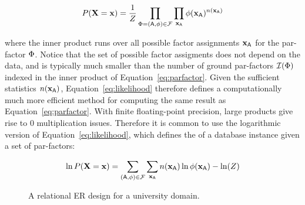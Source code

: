 \begin{equation} \label{eq:likelihood}
P(\mathbf{X}=\mathbf{x}) = \frac{1}{Z} \prod_{\Phi =(\mathsf{A},\phi) \in \mathcal{F}} \prod_{\mathbf{x}_{\mathsf{A}}} 
\phi(\mathbf{x}_{\mathsf{A}})^{n(\mathbf{x}_{\mathsf{A}})}
\end{equation}

where the inner product runs over all possible factor assignments $\mathbf{x}_{\mathsf{A}}$ for the par-factor $\Phi$. Notice that the set of possible factor assigments  does not depend on the data, and is typically much smaller than the number of ground par-factors $\mathcal{I}(\Phi)$ indexed in the inner product of Equation~\ref{eq:parfactor}. Given the sufficient statistics $n(\mathbf{x}_{\mathsf{A}})$, Equation~\ref{eq:likelihood} therefore defines a computationally much more efficient  method for computing the same result as Equation~\ref{eq:parfactor}. With finite floating-point precision, large products give rise to 0 multiplication issues. Therefore it is common to use the logarithmic version of Equation~\ref{eq:likelihood}, which defines the  of a database instance given a set of par-factors:

\begin{equation} \label{eq:log-likelihood}
\ln P(\set{X}=\set{x}) = %
\sum_{(\parrvs,\potential) \in \parfactors} \sum_{\set{x}_{\parrvs}} 
n(\set{x}_{\parrvs}) \ln \potential(\set{x}_{\parrvs}) - \ln(Z)
\end{equation}

\begin{figure}[htbp] %
 \centering
\caption{A relational ER design for a university domain.}
 \label{fig:university-schema}
\end{figure}



